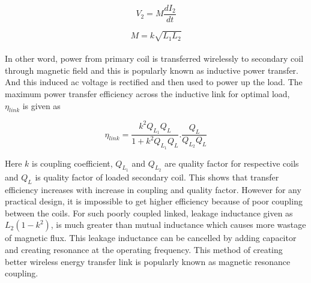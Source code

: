 \documentclass[UKenglish]{ifimaster}  %
\begin{document}
\begin{equation} \label{eq:induced_v} %
V_{2} = M\frac{dI_{2}}{dt}
\end{equation}

\begin{equation} \label{eq:mutual_ind} %
 M =k{\sqrt{L_{1}L_{2}}}
\end{equation}\\

In other word, power from primary coil is transferred wirelessly to secondary coil through magnetic field and this is popularly known as inductive power transfer. And this 
induced ac voltage is rectified and then used to power up the load.
The maximum power transfer efficiency across the inductive link for optimal load, $\eta_{link}$ is given as  \cite{ant_PSC_geometry}

\begin{equation} \label{eq:effi_link}	%
\eta_{link} = \frac{k^2Q_{L_{1}} Q_{L}} {  1 + k^2Q_{L_{1}} Q_{L} } . \frac{Q_{L}}{Q_{L_{2}}Q_{L}} %
\end{equation} 

Here $k$ is coupling coefficient, $Q_{L_{1}}$ and $Q_{L_{2}}$ are quality factor for respective coils  and $Q_{L}$ is quality factor of loaded secondary coil. This shows that transfer 
efficiency increases with increase in coupling and quality factor. However for any practical design, it is impossible to get higher efficiency because of poor coupling between the coils. For such poorly coupled linked, leakage inductance given as $L_{2}(1-k^2)$, is much greater than mutual inductance\cite{koen_robert_2009} which causes more wastage of magnetic flux. This leakage 
inductance can be cancelled by adding capacitor and creating resonance at the operating frequency.  This method of creating better wireless 
energy transfer link is popularly known as magnetic resonance coupling. \\ 

\end{document}
